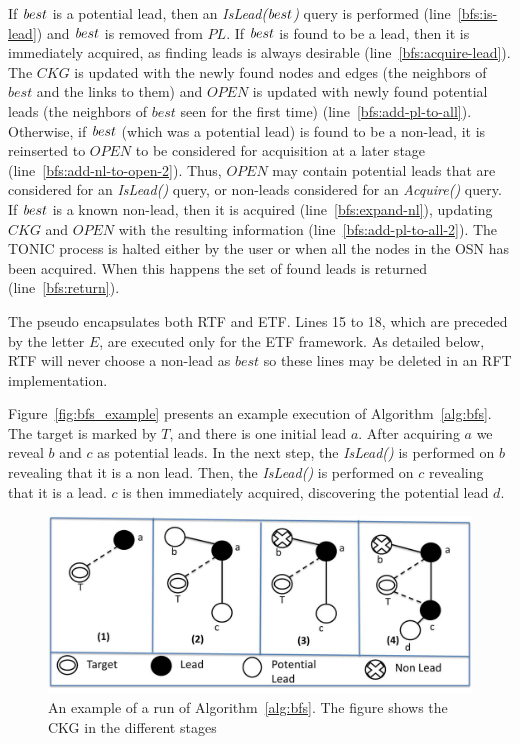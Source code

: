 \documentclass[journal]{IEEEtran}
\newcommand{\islead}[1]{{\em IsLead(#1)}}
\newcommand{\acquire}[1]{{\em Acquire(#1)}}
\newcommand{\best}{{\textit best}}
\begin{document}
If $\best$ is a potential lead, then an \islead{$\best$} query is performed (line~\ref{bfs:is-lead}) and $\best$ is removed from $PL$.
If $\best$ is found to be a lead, then it is immediately acquired, as finding leads is always desirable (line~\ref{bfs:acquire-lead}). The $CKG$ is updated with the newly found nodes and edges (the neighbors of $best$ and the links to them) and $OPEN$ is updated with newly found potential leads (the neighbors of $best$ seen for the first time) (line~\ref{bfs:add-pl-to-all}).
Otherwise, if $\best$ (which was a potential lead) is found to be a non-lead, it is reinserted to $OPEN$ to be considered for acquisition at a later stage (line~\ref{bfs:add-nl-to-open-2}).
Thus, $OPEN$ may contain potential leads that are considered for an \islead{} query, or non-leads considered for an \acquire{} query. 
If $\best$ is a known non-lead, then it is acquired (line~\ref{bfs:expand-nl}), updating $CKG$ and $OPEN$ with the resulting information (line~\ref{bfs:add-pl-to-all-2}).
The TONIC process is halted either by the user  or when all the nodes in the OSN has been acquired. When this happens the set of found leads is returned (line~\ref{bfs:return}). 


The pseudo encapsulates both RTF and ETF. Lines 15 to 18, which are preceded by the letter $E$, are executed only for the ETF framework. As detailed below, RTF will never choose a non-lead as $best$ so these lines may be deleted in an RFT implementation.




Figure~\ref{fig:bfs_example} presents an example execution of Algorithm~\ref{alg:bfs}.
The target is marked by $T$, and there is one initial lead $a$. %
After acquiring $a$ we reveal $b$ and $c$ as potential leads.
In the next step, the \islead{} is performed on $b$ revealing that it is a non lead.
Then, the \islead{} is performed on $c$ revealing that it is a lead. $c$ is then immediately acquired,  discovering the potential lead $d$.




\begin{figure}[t!]
  \centering
	 \includegraphics[width=0.8\linewidth]{btf-process-and-legend-new.jpg}
  \caption{An example of a run of Algorithm~\ref{alg:bfs}. The figure shows the CKG in the different stages}
	\label{fig:bfs_example}\label{fig:basic_fifo}
\end{figure}
\end{document}
